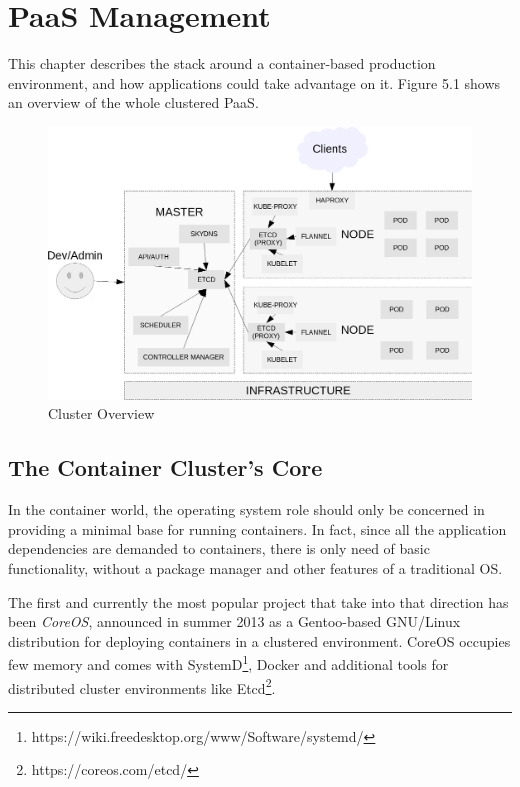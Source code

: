 \chapter{PaaS Management}\label{paas-management}

This chapter describes the stack around a container-based production environment, and how applications could take advantage on it.  Figure 5.1 shows an overview of the whole clustered PaaS.

\begin{figure}[htbp]
\centering
\includegraphics{media/ch5-overview.png}
\caption{Cluster Overview}
\end{figure}

\section{The Container Cluster's Core}\label{the-container-clusters-core}

In the container world, the operating system role should only be concerned in providing a minimal base for running containers.  In fact, since all the application dependencies are demanded to containers, there is only need of basic functionality, without a package manager and other features of a traditional OS.

The first and currently the most popular project that take into that direction has been \textit{CoreOS}, announced in summer 2013 as a Gentoo-based GNU/Linux distribution for deploying containers in a clustered environment. CoreOS occupies few memory and comes with SystemD\footnote{https://wiki.freedesktop.org/www/Software/systemd/}, Docker and additional tools for distributed cluster environments like Etcd\footnote{https://coreos.com/etcd/}.

